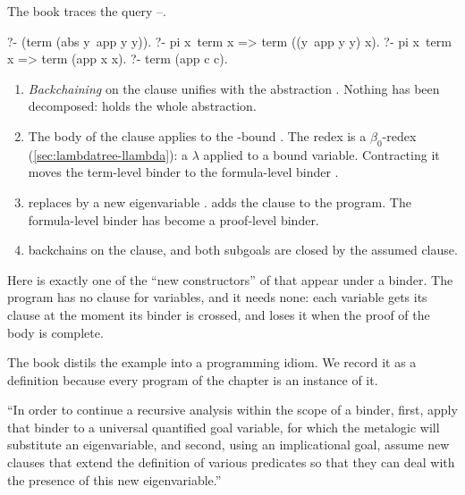 {{\begin{tutorial}
The book traces the query  --.
\begin{lprolog}
?- (term (abs y\ app y y)).
?- pi x\ term x => term ((y\ app y y) x).     %
?- pi x\ term x => term (app x x).            %
?- term (app c c).                            %
\end{lprolog}
\begin{enumerate}[nosep]
  \item \emph{Backchaining} on the  clause unifies  with the abstraction . Nothing
        has been decomposed:  holds the whole abstraction.
  \item The body of the clause applies  to the -bound . The redex  is
        a $\beta_0$-redex (\cref{sec:lambdatree-llambda}): a $\lambda$ applied to a bound variable. Contracting
        it moves the term-level binder  to the formula-level binder .
  \item {} replaces  by a new eigenvariable .  adds the clause
         to the program. The formula-level binder has become a proof-level binder.
  \item {} backchains on the  clause, and both subgoals  are closed by the
        assumed clause.
\end{enumerate}
Here  is exactly one of the \enquote{new constructors} of  that appear under a binder. The program
has no clause for variables, and it needs none: each variable gets its clause at the moment its binder is
crossed, and loses it when the proof of the body is complete.
\end{tutorial}

The book distils the example into a programming idiom. We record it as a definition because every program
of the chapter is an instance of it.

\begin{definition}\label{def:lambdatree-idiom}
\enquote{In order to continue a recursive analysis within the scope of a binder, first, apply that binder to a
universal quantified goal variable, for which the metalogic will substitute an eigenvariable, and second,
using an implicational goal, assume new clauses that extend the definition of various predicates so that
they can deal with the presence of this new eigenvariable.}
\end{definition}

}}
